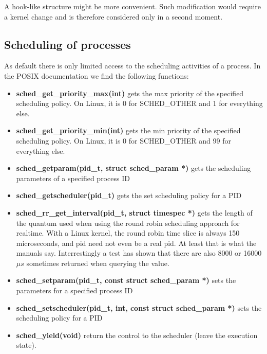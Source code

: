 \documentclass[]{scrartcl}
\begin{document}
A hook-like structure might be more convenient. Such modification would require a kernel change and is therefore considered only in a second moment.

\subsection{Scheduling of processes}

As default there is only limited access to the scheduling activities of a process.
In the POSIX documentation we find the following functions:

\begin{itemize}
	\item \textbf{sched\_get\_priority\_max(int)}
		gets the max priority of the specified scheduling policy. On Linux, it is 0 for SCHED\_OTHER and 1 for everything else. 
	
	\item \textbf{sched\_get\_priority\_min(int)}
		gets the min priority of the specified scheduling policy. On Linux, it is 0 for SCHED\_OTHER and 99 for everything else. 
		
	\item \textbf{sched\_getparam(pid\_t, struct sched\_param *)}
		gets the scheduling parameters of a specified process ID
	
	\item \textbf{sched\_getscheduler(pid\_t)}
		gets the set scheduling policy for a PID
	
	\item \textbf{sched\_rr\_get\_interval(pid\_t, struct timespec *)}
		gets the length of the quantum used when using the round robin scheduling approach for realtime.
		With a Linux kernel, the round robin time slice is always 150 microseconds, and pid need not even be a real pid. At least that is what the manuals say. Interrestingly a test has shown that there are also 8000 or 16000 $\mu s$ sometimes returned when querying the value.
	
	\item \textbf{sched\_setparam(pid\_t, const struct sched\_param *)}
		sets the parameters for a specified process ID
	
	\item \textbf{sched\_setscheduler(pid\_t, int, const struct sched\_param *)}
		sets the scheduling policy for a PID
	
	\item \textbf{sched\_yield(void)}
		return the control to the scheduler (leave the execution state).
\end{itemize}
\end{document}
